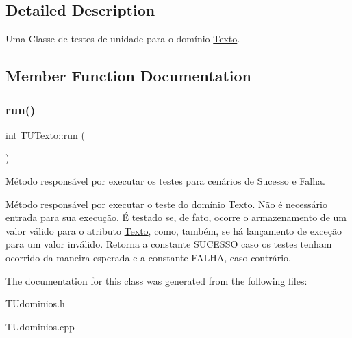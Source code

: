 \subsection{Detailed Description}
Uma Classe de testes de unidade para o domínio \hyperlink{classTexto}{Texto}. 

\subsection{Member Function Documentation}
\mbox{\label{classTUTexto_afd0ced06861f0e336ef7248f36b31e2c}} 
\subsubsection{\texorpdfstring{run()}{run()}}
{\footnotesize\ttfamily int T\+U\+Texto\+::run (\begin{DoxyParamCaption}{ }\end{DoxyParamCaption})}



Método responsável por executar os testes para cenários de Sucesso e Falha. 

Método responsável por executar o teste do domínio \hyperlink{classTexto}{Texto}. Não é necessário entrada para sua execução. É testado se, de fato, ocorre o armazenamento de um valor válido para o atributo \hyperlink{classTexto}{Texto}, como, também, se há lançamento de exceção para um valor inválido. Retorna a constante S\+U\+C\+E\+S\+SO caso os testes tenham ocorrido da maneira esperada e a constante F\+A\+L\+HA, caso contrário. 

The documentation for this class was generated from the following files\+:\begin{DoxyCompactItemize}
\item 
T\+Udominios.\+h\item 
T\+Udominios.\+cpp\end{DoxyCompactItemize}

